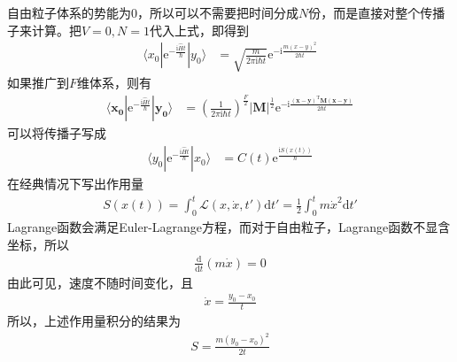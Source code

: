 \documentclass[12pt]{article}
\begin{document}
    自由粒子体系的势能为0，所以可以不需要把时间分成$N$份，而是直接对整个传播子来计算。把$V=0,N=1$代入上式，即得到
    \begin{equation}\begin{aligned}
        \langle x_0 | \mathrm{e}^{-\frac {\mathrm{i}\hat{H}t}{\hbar}} |y_0 \rangle &= \sqrt{\frac {m}{2\pi\mathrm{i} \hbar t}} \mathrm{e}^{-\mathrm{i}\frac {m(x-y)^2}{2\hbar t}}
    \end{aligned}\end{equation}
    如果推广到$F$维体系，则有
    \begin{equation}\begin{aligned}
        \langle \bm{x_0} | \mathrm{e}^{-\frac {\mathrm{i}\hat{H}t}{\hbar}} |\bm{y_0} \rangle &= (\frac {1}{2\pi\mathrm{i} \hbar t})^{\frac F2} |\bm{M}|^{\frac 12} \mathrm{e}^{-\mathrm{i}\frac {\bm{(x-y)}^{\mathrm{T}} \bm{M (x-y)}}{2\hbar t}}
    \end{aligned}\end{equation}
    可以将传播子写成
    \begin{equation}\begin{aligned}
        \langle y_0 | \mathrm{e}^{-\frac {\mathrm{i}\hat{H}t}{\hbar}} |x_0 \rangle &= C(t) \mathrm{e}^{\frac {\mathrm{i}S(x(t))}{\hbar}}
    \end{aligned}\end{equation}
    在经典情况下写出作用量
    \begin{equation}\begin{aligned}
        S(x(t)) = \int_0^t \mathcal{L}(x,\dot{x},t') \mathrm{d}t' = \frac 12 \int_0^t m\dot{x}^2 \mathrm{d}t'
    \end{aligned}\end{equation}
    Lagrange函数会满足Euler-Lagrange方程，而对于自由粒子，Lagrange函数不显含坐标，所以
    \begin{equation}\begin{aligned}
        \frac {\mathrm{d}}{\mathrm{d}t} (m \dot x) = 0
    \end{aligned}\end{equation}
    由此可见，速度不随时间变化，且
    \begin{equation}\begin{aligned}
        \dot{x} = \frac {y_0-x_0}t
    \end{aligned}\end{equation}
    所以，上述作用量积分的结果为
    \begin{equation}\begin{aligned}
        S = \frac {m(y_0 - x_0)^2}{2t}
    \end{aligned}\end{equation}
\end{document}
